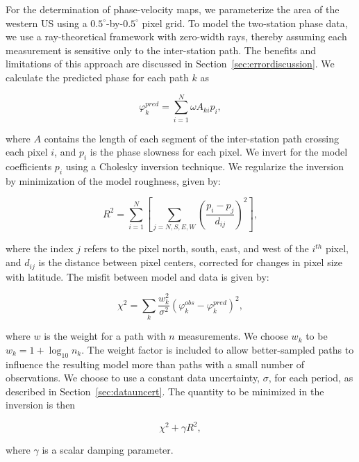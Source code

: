 \documentclass[12pt,oneside]{book}
\newcommand{\degree}[1]{\mbox{$#1^{\circ}$}}
\begin{document}
For the determination of phase-velocity maps, we parameterize the area of the western US using a \degree{0.5}\nobreakdash-by\nobreakdash-\degree{0.5} pixel grid. To model the two-station phase data, we use a ray-theoretical framework with zero-width rays, thereby assuming each measurement is sensitive only to the inter-station path. The benefits and limitations of this approach are discussed in Section~\ref{sec:errordiscussion}. We calculate the predicted phase for each path $k$ as
%
\begin{linenomath*}
\begin{equation}
\varphi^{pred}_k = \sum_{i=1}^{N}{\omega A_{ki} p_i},
\end{equation}
\end{linenomath*}
%
where $A$ contains the length of each segment of the inter-station path crossing each pixel $i$, and $p_i$ is the phase slowness for each pixel. We invert for the model coefficients $p_i$ using a Cholesky inversion technique. We regularize the inversion by minimization of the model roughness, given by:
\begin{linenomath*}
\begin{equation}
R^2 = \sum_{i=1}^{N}{\left[ \sum_{j=N,S,E,W}{\left( \frac{p_i-p_j}{d_{ij}}\right) ^2}\right]},
\end{equation}
\end{linenomath*}
%
where the index $j$ refers to the pixel north, south, east, and west of the $i^{th}$ pixel, and $d_{ij}$ is the distance between pixel centers, corrected for changes in pixel size with latitude. The misfit between model and data is given by:
\begin{linenomath*}
\begin{equation}
\chi^2 = \sum_k{\frac{w_k^2}{\sigma^2} \left( \varphi^{obs}_k - \varphi^{pred}_k \right)^2},
\end{equation}
\end{linenomath*}
where $w$ is the weight for a path with $n$ measurements. We choose $w_k$ to be $w_k=1+\log_{10}n_k$. The weight factor is included to allow better-sampled paths to influence the resulting model more than paths with a small number of observations. We choose to use a constant data uncertainty, $\sigma$, for each period, as described in Section~\ref{sec:datauncert}. The quantity to be minimized in the inversion is then
\begin{linenomath*}
\begin{equation}
\chi^2 + \gamma R^2,
\end{equation}
\end{linenomath*}
where $\gamma$ is a scalar damping parameter. 
\end{document}
